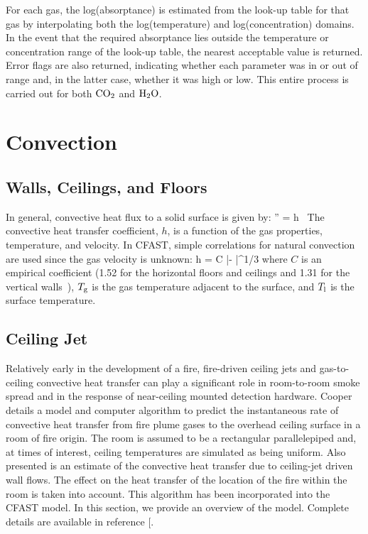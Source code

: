 For each gas, the log(absorptance) is estimated from the look-up table for that gas  by  interpolating both the log(temperature) and log(concentration) domains. In the event that the required absorptance lies outside the temperature or concentration range of the look-up table, the nearest acceptable value is returned. Error flags are also returned, indicating whether each parameter was in or out of range and, in the latter case, whether it was high or low.  This entire process is carried out for both $\textnormal{CO}_2$  and $\textnormal{H}_2 \textnormal{O}$.

\section{Convection}

\subsection{Walls, Ceilings, and Floors}

In general, convective heat flux to a solid surface is given by:
\be 
   \dqc'' = h \, \brackets{\Tg - \Ts}  \label{convective_heat_flux}
\ee
The convective heat transfer coefficient, $h$, is a function of the gas properties, temperature, and velocity. In CFAST, simple correlations for natural convection are used since the gas velocity is unknown:
\be 
   h = C {|\Tg - \Ts|}^{1/3} 
\ee
where $C$ is an empirical coefficient (1.52 for the horizontal floors and ceilings and 1.31 for the vertical walls~\cite{Holman:1990}), $T_{\rm g}$ is the gas temperature adjacent to the surface, and $T_{\rm l}$ is the surface temperature.

\subsection{Ceiling Jet}

Relatively early in the development of a fire, fire-driven ceiling jets and gas-to-ceiling convective heat transfer can play a significant role in room-to-room smoke spread and in the response of near-ceiling mounted detection hardware.  Cooper \cite{Cooper:1991} details a model and computer algorithm to predict the instantaneous rate of convective heat transfer from fire plume gases to the overhead ceiling surface in a room of fire origin.  The room is assumed to be a rectangular parallelepiped and, at times of interest, ceiling temperatures are simulated as being uniform.  Also presented is an estimate of the convective heat transfer due to ceiling-jet driven wall flows.  The effect on the heat transfer of the location of the fire within the room is taken into account.  This algorithm has been incorporated into the CFAST model.  In this section, we provide an overview of the model.  Complete details are available in reference [\cite{Cooper:1991}.

